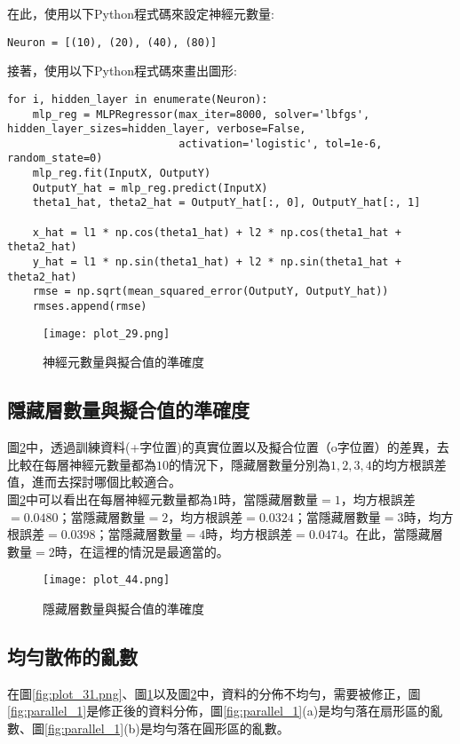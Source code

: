 \documentclass[12pt, a4paper]{article}
\begin{document}
在此，使用以下Python程式碼來設定神經元數量\;:
\begin{lstlisting}
Neuron = [(10), (20), (40), (80)]
\end{lstlisting}

接著，使用以下Python程式碼來畫出圖形\;:
\begin{lstlisting}
for i, hidden_layer in enumerate(Neuron):
    mlp_reg = MLPRegressor(max_iter=8000, solver='lbfgs', hidden_layer_sizes=hidden_layer, verbose=False,
                           activation='logistic', tol=1e-6, random_state=0)
    mlp_reg.fit(InputX, OutputY)  
    OutputY_hat = mlp_reg.predict(InputX) 
    theta1_hat, theta2_hat = OutputY_hat[:, 0], OutputY_hat[:, 1]

    x_hat = l1 * np.cos(theta1_hat) + l2 * np.cos(theta1_hat + theta2_hat)
    y_hat = l1 * np.sin(theta1_hat) + l2 * np.sin(theta1_hat + theta2_hat)
    rmse = np.sqrt(mean_squared_error(OutputY, OutputY_hat))
    rmses.append(rmse)

\end{lstlisting}

\begin{figure}[H]
\centering
\texttt{[image: plot\_29.png]}
\caption{神經元數量與擬合值的準確度}
\label{fig:plot_29.png}
\end{figure}



\subsection{隱藏層數量與擬合值的準確度}
圖\;\ref{fig:plot_44.png}\;中，透過訓練資料(+字位置)的真實位置以及擬合位置（o字位置）的差異，去比較在每層神經元數量都為\;$10$\;的情況下，隱藏層數量分別為\;$1, 2, 3, 4$\;的均方根誤差值，進而去探討哪個比較適合。\\
圖\;\ref{fig:plot_44.png}\;中可以看出在每層神經元數量都為\;$1$\;時，當隱藏層數量\;$=1$\;，均方根誤差\\$=0.0480$\;；當隱藏層數量\;$=2$\;，均方根誤差\;$=0.0324$\;；當隱藏層數量\;$=3$\;時，均方根誤差\;$=0.0398$\;；當隱藏層數量\;$=4$\;時，均方根誤差\;$=0.0474$\;。在此，當隱藏層數量\;$=2$\;時，在這裡的情況是最適當的。

\begin{figure}[H]
\centering
\texttt{[image: plot\_44.png]}
\caption{隱藏層數量與擬合值的準確度}
\label{fig:plot_44.png}
\end{figure}


\subsection{均勻散佈的亂數}
在圖\;\ref{fig:plot_31.png}\;、圖\;\ref{fig:plot_29.png}\;以及圖\;\ref{fig:plot_44.png}\;中，資料的分佈不均勻，需要被修正，圖\;\ref{fig:parallel_1}\;是修正後的資料分佈，圖\;\ref{fig:parallel_1}\;(a)\;是均勻落在扇形區的亂數、圖\;\ref{fig:parallel_1}\;(b)\;是均勻落在圓形區的亂數。
\end{document}

